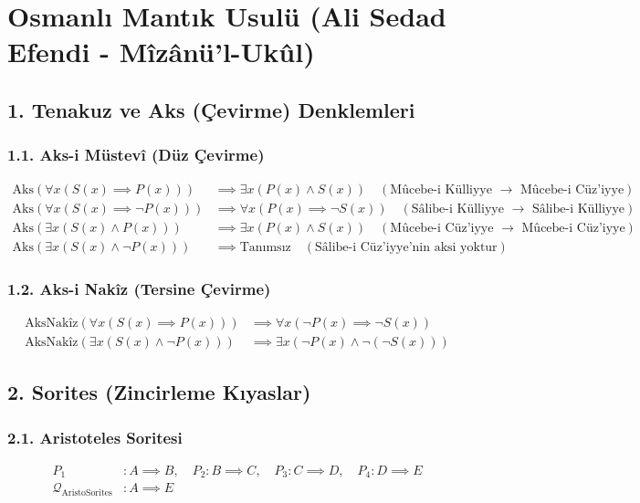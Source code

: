 \documentclass[11pt, a4paper]{article}
\begin{document}
\section{Osmanlı Mantık Usulü (Ali Sedad Efendi - Mîzânü'l-Ukûl)}

\subsection{1. Tenakuz ve Aks (Çevirme) Denklemleri}

\subsubsection{1.1. Aks-i Müstevî (Düz Çevirme)}
\begin{align}
\text{Aks}(\forall x (S(x) \implies P(x))) &\implies \exists x (P(x) \land S(x)) \quad (\text{Mûcebe-i Külliyye $\to$ Mûcebe-i Cüz'iyye}) \\
\text{Aks}(\forall x (S(x) \implies \neg P(x))) &\implies \forall x (P(x) \implies \neg S(x)) \quad (\text{Sâlibe-i Külliyye $\to$ Sâlibe-i Külliyye}) \\
\text{Aks}(\exists x (S(x) \land P(x))) &\implies \exists x (P(x) \land S(x)) \quad (\text{Mûcebe-i Cüz'iyye $\to$ Mûcebe-i Cüz'iyye}) \\
\text{Aks}(\exists x (S(x) \land \neg P(x))) &\implies \text{Tanımsız} \quad (\text{Sâlibe-i Cüz'iyye'nin aksi yoktur})
\end{align}

\subsubsection{1.2. Aks-i Nakîz (Tersine Çevirme)}
\begin{align}
\text{AksNakîz}(\forall x (S(x) \implies P(x))) &\implies \forall x (\neg P(x) \implies \neg S(x)) \\
\text{AksNakîz}(\exists x (S(x) \land \neg P(x))) &\implies \exists x (\neg P(x) \land \neg (\neg S(x)))
\end{align}

\subsection{2. Sorites (Zincirleme Kıyaslar)}

\subsubsection{2.1. Aristoteles Soritesi}
\begin{align}
P_1 &: A \implies B, \quad P_2 : B \implies C, \quad P_3 : C \implies D, \quad P_4 : D \implies E \\
\mathcal{Q}_{\text{AristoSorites}} &: A \implies E
\end{align}
\end{document}
